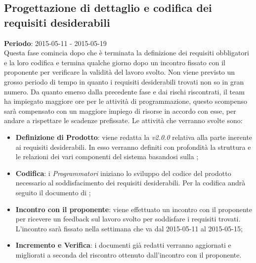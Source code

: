 	\subsection{Progettazione di dettaglio e codifica dei requisiti desiderabili} %
	\label{sub:progettazione_di_dettaglio_e_codifica_dei_requisiti_desiderabili}
	\textbf{Periodo}:  2015-05-11 - 2015-05-19 \\
	Questa fase comincia dopo che è terminata la definizione dei requisiti obbligatori e la loro codifica e termina qualche giorno dopo un incontro fissato con il proponente per verificare la validità del lavoro svolto. Non viene previsto un grosso periodo di tempo in quanto i requisiti desiderabili trovati non so in gran numero. \newline
	Da quanto emerso dalla precedente fase e dai rischi riscontrati, il team ha impiegato maggiore ore per le attività di programmazione, questo scompenso sarà compensato con un maggiore impiego di risorse in accordo con esse, per andare a rispettare le scadenze prefissate. \newline
	Le attività che verranno svolte sono:
		\begin{itemize}
			\item \textbf{Definizione di Prodotto}: viene redatta la \docNameDdP{} \emph{v2.0.0} relativa alla parte inerente ai requisiti desiderabili. In esso verranno definiti con profondità la struttura e le relazioni dei vari componenti del sistema basandosi sulla \docNameVersionST;
			\item \textbf{Codifica}: i \emph{Programmatori} iniziano lo sviluppo del codice del prodotto necessario al soddisfacimento dei requisiti desiderabili. Per la codifica andrà seguito il documento di \docNameVersionDdP;
			\item \textbf{Incontro con il proponente}: viene effettuato un incontro con il proponente per ricevere un feedback sul lavoro svolto per soddisfare i requisiti trovati. \\
			L'incontro sarà fissato nella settimana che va dal 2015-05-11 al 2015-05-15;
			\item \textbf{Incremento e Verifica}: i documenti già redatti verranno aggiornati e migliorati a seconda del riscontro ottenuto dall'incontro con il proponente.
		\end{itemize}
		
